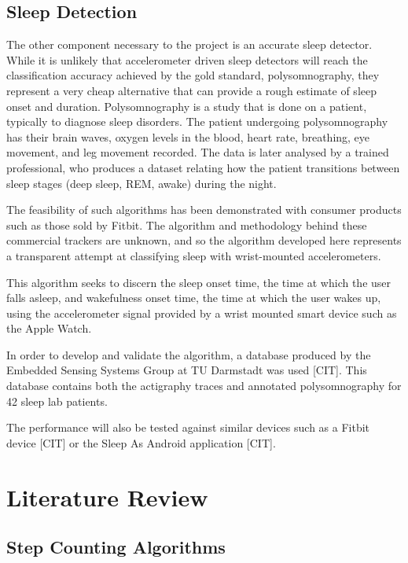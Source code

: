         \section{Sleep Detection}

            The other component necessary to the project is an accurate sleep detector. While it is unlikely that accelerometer driven sleep detectors will reach the classification accuracy achieved by the gold standard, polysomnography, they represent a very cheap alternative that can provide a rough estimate of sleep onset and duration. Polysomnography is a study that is done on a patient, typically to diagnose sleep disorders. The patient undergoing polysomnography has their brain waves, oxygen levels in the blood, heart rate, breathing, eye movement, and leg movement recorded. The data is later analysed by a trained professional, who produces a dataset relating how the patient transitions between sleep stages (deep sleep, REM, awake) during the night.

            The feasibility of such algorithms has been demonstrated with consumer products such as those sold by Fitbit. The algorithm and methodology behind these commercial trackers are unknown, and so the algorithm developed here represents a transparent attempt at classifying sleep with wrist-mounted accelerometers.

            This algorithm seeks to discern the sleep onset time, the time at which the user falls asleep, and wakefulness onset time, the time at which the user wakes up, using the accelerometer signal provided by a wrist mounted smart device such as the Apple Watch.

            In order to develop and validate the algorithm, a database produced by the Embedded Sensing Systems Group at TU Darmstadt was used [CIT]. This database contains both the actigraphy traces and annotated polysomnography for 42 sleep lab patients.

            The performance will also be tested against similar devices such as a Fitbit device [CIT] or the Sleep As Android application [CIT]. 


    \chapter{Literature Review}

        \section{Step Counting Algorithms}

